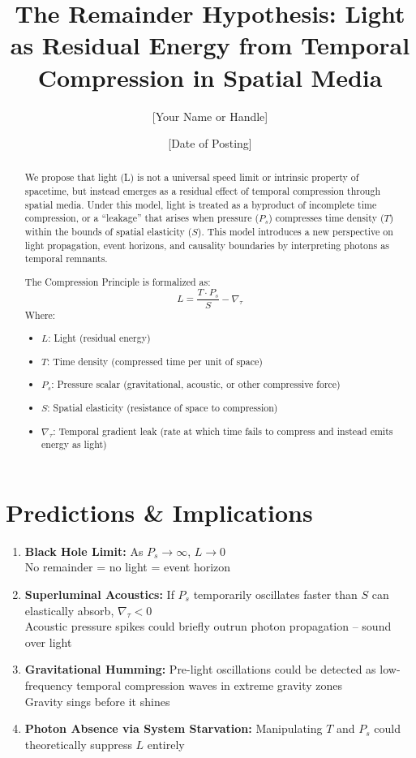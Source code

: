 \documentclass[12pt]{article}
\title{The Remainder Hypothesis: Light as Residual Energy from Temporal Compression in Spatial Media}
\author{[Your Name or Handle]}
\date{[Date of Posting]}
\begin{document}
\maketitle

\begin{abstract}
We propose that light (L) is not a universal speed limit or intrinsic property of spacetime, but instead emerges as a residual effect of temporal compression through spatial media. Under this model, light is treated as a byproduct of incomplete time compression, or a ``leakage'' that arises when pressure ($P_s$) compresses time density ($T$) within the bounds of spatial elasticity ($S$). This model introduces a new perspective on light propagation, event horizons, and causality boundaries by interpreting photons as temporal remnants.

The Compression Principle is formalized as:
\[
L = \frac{T \cdot P_s}{S} - \nabla_\tau
\]
Where:
\begin{itemize}
  \item $L$: Light (residual energy)
  \item $T$: Time density (compressed time per unit of space)
  \item $P_s$: Pressure scalar (gravitational, acoustic, or other compressive force)
  \item $S$: Spatial elasticity (resistance of space to compression)
  \item $\nabla_\tau$: Temporal gradient leak (rate at which time fails to compress and instead emits energy as light)
\end{itemize}
\end{abstract}

\section*{Predictions \& Implications}
\begin{enumerate}
  \item \textbf{Black Hole Limit:} As $P_s \rightarrow \infty$, $L \rightarrow 0$  \\
  No remainder = no light = event horizon

  \item \textbf{Superluminal Acoustics:} If $P_s$ temporarily oscillates faster than $S$ can elastically absorb, $\nabla_\tau < 0$  \\
  Acoustic pressure spikes could briefly outrun photon propagation -- sound over light

  \item \textbf{Gravitational Humming:} Pre-light oscillations could be detected as low-frequency temporal compression waves in extreme gravity zones  \\
  Gravity sings before it shines

  \item \textbf{Photon Absence via System Starvation:} Manipulating $T$ and $P_s$ could theoretically suppress $L$ entirely
\end{enumerate}
\end{document}
